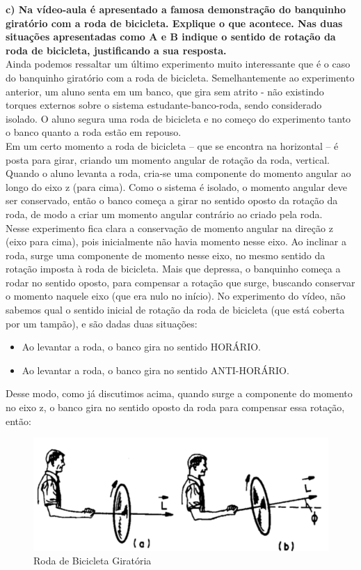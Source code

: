 \textbf{c) Na vídeo-aula é apresentado a famosa demonstração do banquinho giratório com a roda de bicicleta. Explique o que acontece. Nas duas situações apresentadas como A e B indique o sentido de rotação da roda de bicicleta, justificando a sua resposta.}\\

Ainda podemos ressaltar um último experimento muito interessante que é o caso do banquinho giratório com a roda de bicicleta. Semelhantemente ao experimento anterior, um aluno senta em um banco, que gira sem atrito - não existindo torques externos sobre o sistema estudante-banco-roda, sendo considerado isolado. O aluno segura uma roda de bicicleta e no começo do experimento tanto o banco quanto a roda estão em repouso.\\

Em um certo momento a roda de bicicleta – que se encontra na horizontal – é posta para girar, criando um momento angular de rotação da roda, vertical. Quando o aluno levanta a roda, cria-se uma componente do momento angular ao longo do eixo z (para cima). Como o sistema é isolado, o momento angular deve ser conservado, então o banco começa a girar no sentido oposto da rotação da roda, de modo a criar um momento angular contrário ao criado pela roda.\\

Nesse experimento fica clara a conservação de momento angular na direção z (eixo para cima), pois inicialmente não havia momento nesse eixo. Ao inclinar a roda, surge uma componente de momento nesse eixo, no mesmo sentido da rotação imposta à roda de bicicleta. Mais que depressa, o banquinho começa a rodar no sentido oposto, para compensar a rotação que surge, buscando conservar o momento naquele eixo (que era nulo no início). No experimento do vídeo, não sabemos qual o sentido inicial de rotação da roda de bicicleta (que está coberta por um tampão), e são dadas duas situações:

\begin{itemize}
    \item Ao levantar a roda, o banco gira no sentido HORÁRIO.
    \item Ao levantar a roda, o banco gira no sentido ANTI-HORÁRIO.
\end{itemize}

Desse modo, como já discutimos acima, quando surge a componente do momento no eixo z, o banco gira no sentido oposto da roda para compensar essa rotação, então:

\begin{figure}[H]
  \centering
  \includegraphics[scale=1.4]{images/i5.png}
  \caption{Roda de Bicicleta Giratória}
\end{figure}

